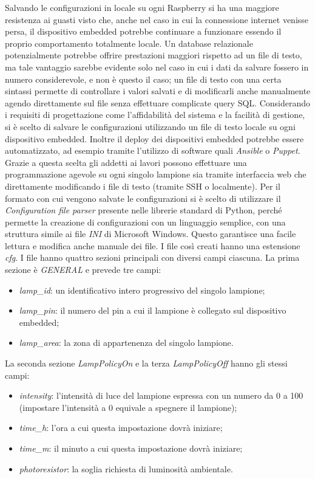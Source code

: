 Salvando le configurazioni in locale su ogni Raspberry si ha una maggiore resistenza ai guasti visto che, anche nel caso in cui la connessione internet venisse persa, il dispositivo embedded potrebbe continuare a funzionare essendo il proprio comportamento totalmente locale.
Un database relazionale potenzialmente potrebbe offrire prestazioni maggiori rispetto ad un file di testo, ma tale vantaggio sarebbe evidente solo nel caso in cui i dati da salvare fossero in numero considerevole, e non è questo il caso;
un file di testo con una certa sintassi permette di controllare i valori salvati e di modificarli anche manualmente agendo direttamente sul file senza effettuare complicate query SQL.
Considerando i requisiti di progettazione come l'affidabilità del sistema e la facilità di gestione, si è scelto di salvare le configurazioni utilizzando un file di testo locale su ogni dispositivo embedded.
Inoltre il deploy dei dispositivi embedded potrebbe essere automatizzato, ad esempio tramite l'utilizzo di software quali \textit{Ansible} o \textit{Puppet}.
Grazie a questa scelta gli addetti ai lavori possono effettuare una programmazione agevole su ogni singolo lampione sia tramite interfaccia web che direttamente modificando i file di testo (tramite SSH o localmente).
Per il formato con cui vengono salvate le configurazioni si è scelto di utilizzare il \textit{Configuration file parser} presente nelle librerie standard di Python, perché permette la creazione di configurazioni con un linguaggio semplice, con una struttura simile ai file \textit{INI} di Microsoft Windows.
Questo garantisce una facile lettura e modifica anche manuale dei file. I file così creati hanno una estensione \textit{cfg}. I file hanno quattro sezioni principali con diversi campi ciascuna.
La prima sezione è \textit{GENERAL} e prevede tre campi:
\begin{itemize}
 \item \textit{lamp\_id}: un identificativo intero progressivo del singolo lampione;
 \item \textit{lamp\_pin}: il numero del pin a cui il lampione è collegato sul dispositivo embedded;
 \item \textit{lamp\_area}: la zona di appartenenza del singolo lampione.
\end{itemize}
La seconda sezione \textit{LampPolicyOn} e la terza \textit{LampPolicyOff} hanno gli stessi campi:
\begin{itemize}
 \item \textit{intensity}: l'intensità di luce del lampione espressa con un numero da 0 a 100 (impostare l'intensità a 0 equivale a spegnere il lampione);
 \item \textit{time\_h}: l'ora a cui questa impostazione dovrà iniziare;
 \item \textit{time\_m}: il minuto a cui questa impostazione dovrà iniziare;
 \item \textit{photoresistor}: la soglia richiesta di luminosità ambientale.
\end{itemize}
